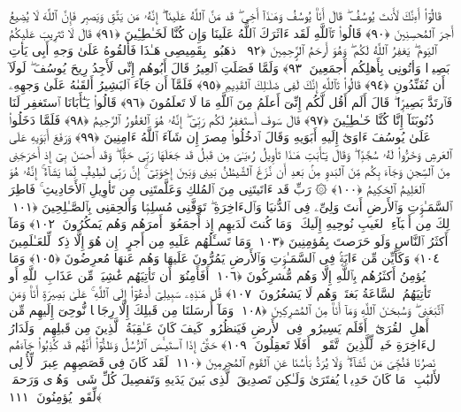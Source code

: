  قَالُوٓا۟ أَءِنَّكَ لَأَنتَ يُوسُفُ ۖ قَالَ أَنَا۠ يُوسُفُ وَهَـٰذَآ أَخِى ۖ قَد مَنَّ ٱللَّهُ عَلَينَآ ۖ إِنَّهُۥ مَن يَتَّقِ وَيَصبِر فَإِنَّ ٱللَّهَ لَا يُضِيعُ أَجرَ ٱلمُحسِنِينَ ﴿٩٠﴾
 قَالُوا۟ تَٱللَّهِ لَقَد ءَاثَرَكَ ٱللَّهُ عَلَينَا وَإِن كُنَّا لَخَـٰطِـِٔينَ ﴿٩١﴾
 قَالَ لَا تَثرِيبَ عَلَيكُمُ ٱليَومَ ۖ يَغفِرُ ٱللَّهُ لَكُم ۖ وَهُوَ أَرحَمُ ٱلرَّٟحِمِينَ ﴿٩٢﴾
 ٱذهَبُوا۟ بِقَمِيصِى هَـٰذَا فَأَلقُوهُ عَلَىٰ وَجهِ أَبِى يَأتِ بَصِيرًۭا وَأتُونِى بِأَهلِكُم أَجمَعِينَ ﴿٩٣﴾
 وَلَمَّا فَصَلَتِ ٱلعِيرُ قَالَ أَبُوهُم إِنِّى لَأَجِدُ رِيحَ يُوسُفَ ۖ لَولَآ أَن تُفَنِّدُونِ ﴿٩٤﴾
 قَالُوا۟ تَٱللَّهِ إِنَّكَ لَفِى ضَلَـٰلِكَ ٱلقَدِيمِ ﴿٩٥﴾
 فَلَمَّآ أَن جَآءَ ٱلبَشِيرُ أَلقَىٰهُ عَلَىٰ وَجهِهِۦ فَٱرتَدَّ بَصِيرًۭا ۖ قَالَ أَلَم أَقُل لَّكُم إِنِّىٓ أَعلَمُ مِنَ ٱللَّهِ مَا لَا تَعلَمُونَ ﴿٩٦﴾
 قَالُوا۟ يَـٰٓأَبَانَا ٱستَغفِر لَنَا ذُنُوبَنَآ إِنَّا كُنَّا خَـٰطِـِٔينَ ﴿٩٧﴾
 قَالَ سَوفَ أَستَغفِرُ لَكُم رَبِّىٓ ۖ إِنَّهُۥ هُوَ ٱلغَفُورُ ٱلرَّحِيمُ ﴿٩٨﴾
 فَلَمَّا دَخَلُوا۟ عَلَىٰ يُوسُفَ ءَاوَىٰٓ إِلَيهِ أَبَوَيهِ وَقَالَ ٱدخُلُوا۟ مِصرَ إِن شَآءَ ٱللَّهُ ءَامِنِينَ ﴿٩٩﴾
 وَرَفَعَ أَبَوَيهِ عَلَى ٱلعَرشِ وَخَرُّوا۟ لَهُۥ سُجَّدًۭا ۖ وَقَالَ يَـٰٓأَبَتِ هَـٰذَا تَأوِيلُ رُءيَـٰىَ مِن قَبلُ قَد جَعَلَهَا رَبِّى حَقًّۭا ۖ وَقَد أَحسَنَ بِىٓ إِذ أَخرَجَنِى مِنَ ٱلسِّجنِ وَجَآءَ بِكُم مِّنَ ٱلبَدوِ مِنۢ بَعدِ أَن نَّزَغَ ٱلشَّيطَٰنُ بَينِى وَبَينَ إِخوَتِىٓ ۚ إِنَّ رَبِّى لَطِيفٌۭ لِّمَا يَشَآءُ ۚ إِنَّهُۥ هُوَ ٱلعَلِيمُ ٱلحَكِيمُ ﴿١٠٠﴾
 ۞ رَبِّ قَد ءَاتَيتَنِى مِنَ ٱلمُلكِ وَعَلَّمتَنِى مِن تَأوِيلِ ٱلأَحَادِيثِ ۚ فَاطِرَ ٱلسَّمَـٰوَٟتِ وَٱلأَرضِ أَنتَ وَلِىِّۦ فِى ٱلدُّنيَا وَٱلءَاخِرَةِ ۖ تَوَفَّنِى مُسلِمًۭا وَأَلحِقنِى بِٱلصَّـٰلِحِينَ ﴿١٠١﴾
 ذَٟلِكَ مِن أَنۢبَآءِ ٱلغَيبِ نُوحِيهِ إِلَيكَ ۖ وَمَا كُنتَ لَدَيهِم إِذ أَجمَعُوٓا۟ أَمرَهُم وَهُم يَمكُرُونَ ﴿١٠٢﴾
 وَمَآ أَكثَرُ ٱلنَّاسِ وَلَو حَرَصتَ بِمُؤمِنِينَ ﴿١٠٣﴾
 وَمَا تَسـَٔلُهُم عَلَيهِ مِن أَجرٍ ۚ إِن هُوَ إِلَّا ذِكرٌۭ لِّلعَـٰلَمِينَ ﴿١٠٤﴾
 وَكَأَيِّن مِّن ءَايَةٍۢ فِى ٱلسَّمَـٰوَٟتِ وَٱلأَرضِ يَمُرُّونَ عَلَيهَا وَهُم عَنهَا مُعرِضُونَ ﴿١٠٥﴾
 وَمَا يُؤمِنُ أَكثَرُهُم بِٱللَّهِ إِلَّا وَهُم مُّشرِكُونَ ﴿١٠٦﴾
 أَفَأَمِنُوٓا۟ أَن تَأتِيَهُم غَٰشِيَةٌۭ مِّن عَذَابِ ٱللَّهِ أَو تَأتِيَهُمُ ٱلسَّاعَةُ بَغتَةًۭ وَهُم لَا يَشعُرُونَ ﴿١٠٧﴾
 قُل هَـٰذِهِۦ سَبِيلِىٓ أَدعُوٓا۟ إِلَى ٱللَّهِ ۚ عَلَىٰ بَصِيرَةٍ أَنَا۠ وَمَنِ ٱتَّبَعَنِى ۖ وَسُبحَـٰنَ ٱللَّهِ وَمَآ أَنَا۠ مِنَ ٱلمُشرِكِينَ ﴿١٠٨﴾
 وَمَآ أَرسَلنَا مِن قَبلِكَ إِلَّا رِجَالًۭا نُّوحِىٓ إِلَيهِم مِّن أَهلِ ٱلقُرَىٰٓ ۗ أَفَلَم يَسِيرُوا۟ فِى ٱلأَرضِ فَيَنظُرُوا۟ كَيفَ كَانَ عَـٰقِبَةُ ٱلَّذِينَ مِن قَبلِهِم ۗ وَلَدَارُ ٱلءَاخِرَةِ خَيرٌۭ لِّلَّذِينَ ٱتَّقَوا۟ ۗ أَفَلَا تَعقِلُونَ ﴿١٠٩﴾
 حَتَّىٰٓ إِذَا ٱستَيـَٔسَ ٱلرُّسُلُ وَظَنُّوٓا۟ أَنَّهُم قَد كُذِبُوا۟ جَآءَهُم نَصرُنَا فَنُجِّىَ مَن نَّشَآءُ ۖ وَلَا يُرَدُّ بَأسُنَا عَنِ ٱلقَومِ ٱلمُجرِمِينَ ﴿١١٠﴾
 لَقَد كَانَ فِى قَصَصِهِم عِبرَةٌۭ لِّأُو۟لِى ٱلأَلبَٰبِ ۗ مَا كَانَ حَدِيثًۭا يُفتَرَىٰ وَلَـٰكِن تَصدِيقَ ٱلَّذِى بَينَ يَدَيهِ وَتَفصِيلَ كُلِّ شَىءٍۢ وَهُدًۭى وَرَحمَةًۭ لِّقَومٍۢ يُؤمِنُونَ ﴿١١١﴾
 
